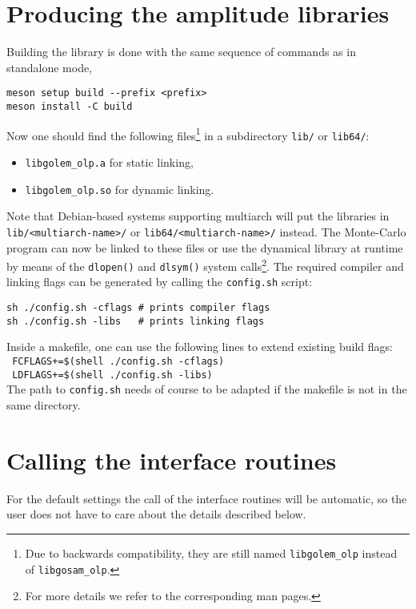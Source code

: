 \section{Producing the amplitude libraries}
Building the library is done with the same sequence of commands as in standalone mode,
\begin{lstlisting}[style=sh]
meson setup build --prefix <prefix> 
meson install -C build
\end{lstlisting}
Now one should find the following files\footnote{Due to backwards compatibility, they are still named \texttt{libgolem\_olp} instead of \texttt{libgosam\_olp}.} in a subdirectory \texttt{lib/} or \texttt{lib64/}:
\begin{itemize}
\item \texttt{libgolem\_olp.a} for static linking,
\item \texttt{libgolem\_olp.so} for dynamic linking.
\end{itemize}
Note that Debian-based systems supporting multiarch will put the libraries in \texttt{lib/<multiarch-name>/} or \texttt{lib64/<multiarch-name>/} instead. The Monte-Carlo program can now be linked to these files or use the dynamical library at runtime by means of the \texttt{dlopen()} and \texttt{dlsym()} system calls\footnote{For more details we refer to the corresponding man pages.}. The required compiler and linking flags can be generated by calling the \texttt{config.sh} script:
\begin{lstlisting}[style=sh]
sh ./config.sh -cflags # prints compiler flags 
sh ./config.sh -libs   # prints linking flags
\end{lstlisting}
Inside a makefile, one can use the following lines to extend existing build flags:\\[5pt]
\texttt{ FCFLAGS+=\$(shell ./config.sh -cflags)} \\
\texttt{ LDFLAGS+=\$(shell ./config.sh -libs)}\\[5pt]
\noindent The path to \texttt{config.sh} needs of course to be adapted if the makefile is not in the same directory.

\section{Calling the interface routines}\label{sec:BLHA_calling}

For the default settings the call of the interface routines 
will be automatic, so the user does not have to care about the details described below.

